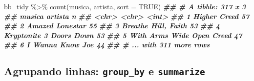 \documentclass[
  11pt]{report}
\newenvironment{Shaded}{\begin{snugshade}}{\end{snugshade}}
\newcommand{\AttributeTok}[1]{\textcolor[rgb]{0.77,0.63,0.00}{#1}}
\newcommand{\ConstantTok}[1]{\textcolor[rgb]{0.00,0.00,0.00}{#1}}
\newcommand{\DocumentationTok}[1]{\textcolor[rgb]{0.56,0.35,0.01}{\textbf{\textit{#1}}}}
\newcommand{\FunctionTok}[1]{\textcolor[rgb]{0.00,0.00,0.00}{#1}}
\newcommand{\NormalTok}[1]{#1}
\newcommand{\SpecialCharTok}[1]{\textcolor[rgb]{0.00,0.00,0.00}{#1}}
\renewenvironment{Shaded}{
    \begin{mdframed}[%
      roundcorner=2pt,%
      innerleftmargin=5pt,%
      innerrightmargin=5pt,%
      topline=true,%
      leftline=true,%
      rightline=true,%
      bottomline=true,%
      linewidth=0.5pt,%
      linecolor=black!20,%
      backgroundcolor=black!2,%
      skipabove=2ex,%
      skipbelow=2.5ex%
    ]%
  }
  {
    \end{mdframed}
  }
\begin{document}
\begin{itemize}
\begin{Shaded}
\begin{Highlighting}[]
\NormalTok{bb\_tidy }\SpecialCharTok{\%\textgreater{}\%} 
  \FunctionTok{count}\NormalTok{(musica, artista, }\AttributeTok{sort =} \ConstantTok{TRUE}\NormalTok{)}
\DocumentationTok{\#\# \# A tibble: 317 x 3}
\DocumentationTok{\#\#   musica              artista          n}
\DocumentationTok{\#\#   \textless{}chr\textgreater{}               \textless{}chr\textgreater{}        \textless{}int\textgreater{}}
\DocumentationTok{\#\# 1 Higher              Creed           57}
\DocumentationTok{\#\# 2 Amazed              Lonestar        55}
\DocumentationTok{\#\# 3 Breathe             Hill, Faith     53}
\DocumentationTok{\#\# 4 Kryptonite          3 Doors Down    53}
\DocumentationTok{\#\# 5 With Arms Wide Open Creed           47}
\DocumentationTok{\#\# 6 I Wanna Know        Joe             44}
\DocumentationTok{\#\# \# ... with 311 more rows}
\end{Highlighting}
\end{Shaded}
\end{itemize}

\hypertarget{agrupando-linhas-group_by-e-summarize}{%
\subsection{\texorpdfstring{Agrupando linhas: \texttt{group\_by} e \texttt{summarize}}{Agrupando linhas: group\_by e summarize}}\label{agrupando-linhas-group_by-e-summarize}}
\end{document}

